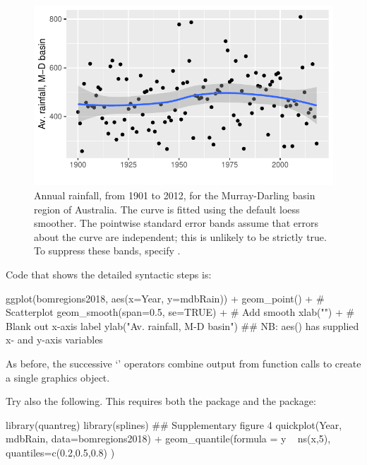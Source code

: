 \begin{figure}
\begin{Schunk}


\centerline{\includegraphics[width=\textwidth]{figs/07-qplot-smooth-1} }

\end{Schunk}
\caption{Annual rainfall, from 1901 to 2012, for the Murray-Darling
  basin region of Australia.  The curve is fitted using the default
  loess smoother. The pointwise standard error bands assume that
  errors about the curve are independent; this is unlikely to be
  strictly true. To suppress these bands, specify
  .\label{fig:ggrain}}
\end{figure}

Code that shows the detailed syntactic steps is:
\begin{Schunk}
\begin{Sinput}
ggplot(bomregions2018, aes(x=Year, y=mdbRain)) +
  geom_point() +                      # Scatterplot
  geom_smooth(span=0.5, se=TRUE) +    # Add smooth
  xlab("") +             # Blank out x-axis label
  ylab("Av. rainfall, M-D basin")
## NB: aes() has supplied x- and y-axis variables
\end{Sinput}
\end{Schunk}
As before, the successive `\code{+}' operators combine output from
function calls to create a single graphics object.

Try also the following.  This requires both the 
package and the  package:
\begin{Schunk}
\begin{Sinput}
library(quantreg)
library(splines)
## Supplementary figure 4
quickplot(Year, mdbRain, data=bomregions2018) +
          geom_quantile(formula = y ~ ns(x,5),
          quantiles=c(0.2,0.5,0.8) )
\end{Sinput}
\end{Schunk}

